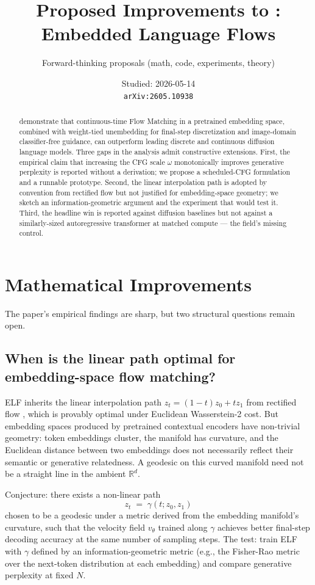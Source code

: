 \documentclass[11pt]{article}
\title{Proposed Improvements to \citet{hu2026elf}: Embedded Language Flows}
\author{Forward-thinking proposals (math, code, experiments, theory)}
\date{Studied: 2026-05-14 \\ \texttt{arXiv:2605.10938}}
\begin{document}
\maketitle

\begin{abstract}
\citet{hu2026elf} demonstrate that continuous-time Flow Matching in a pretrained embedding space, combined with weight-tied unembedding for final-step discretization and image-domain classifier-free guidance, can outperform leading discrete and continuous diffusion language models. Three gaps in the analysis admit constructive extensions. First, the empirical claim that increasing the CFG scale $\omega$ monotonically improves generative perplexity is reported without a derivation; we propose a scheduled-CFG formulation and a runnable prototype. Second, the linear interpolation path is adopted by convention from rectified flow but not justified for embedding-space geometry; we sketch an information-geometric argument and the experiment that would test it. Third, the headline win is reported against diffusion baselines but not against a similarly-sized autoregressive transformer at matched compute --- the field's missing control.
\end{abstract}

\section*{Mathematical Improvements}

The paper's empirical findings are sharp, but two structural questions remain open.

\subsection*{When is the linear path optimal for embedding-space flow matching?}

ELF inherits the linear interpolation path $z_t = (1 - t) z_0 + t z_1$ from rectified flow \citep{liu2022rectified}, which is provably optimal under Euclidean Wasserstein-2 cost. But embedding spaces produced by pretrained contextual encoders have non-trivial geometry: token embeddings cluster, the manifold has curvature, and the Euclidean distance between two embeddings does not necessarily reflect their semantic or generative relatedness. A geodesic on this curved manifold need not be a straight line in the ambient $\mathbb{R}^d$.

Conjecture: there exists a non-linear path
\begin{equation}
z_t \;=\; \gamma(t; z_0, z_1)
\label{eq:curved-path}
\end{equation}
chosen to be a geodesic under a metric derived from the embedding manifold's curvature, such that the velocity field $v_\theta$ trained along $\gamma$ achieves better final-step decoding accuracy at the same number of sampling steps. The test: train ELF with $\gamma$ defined by an information-geometric metric (e.g., the Fisher-Rao metric over the next-token distribution at each embedding) and compare generative perplexity at fixed $N$.
\end{document}

